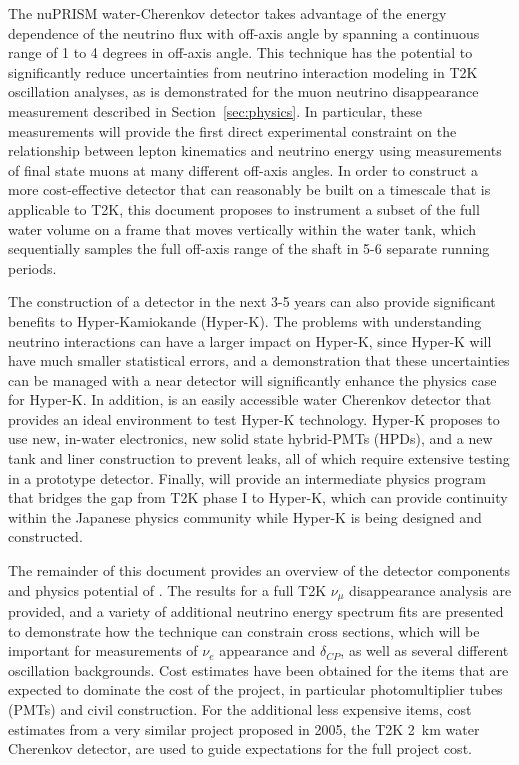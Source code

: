The nuPRISM water-Cherenkov detector takes advantage of the energy dependence of the neutrino flux with off-axis angle by spanning a continuous range of 1 to 4 degrees in off-axis angle.
This technique has the potential to significantly reduce uncertainties from neutrino interaction modeling in T2K oscillation analyses, as is demonstrated for the muon neutrino disappearance measurement described in Section~\ref{sec:physics}. In particular, these measurements will provide the first direct experimental constraint on the relationship between lepton kinematics and neutrino energy using measurements of final state muons at many different off-axis angles.
 In order to construct a more cost-effective detector that can reasonably be built on a timescale that is applicable to T2K, this document proposes to instrument a subset of the full water volume on a frame that moves vertically within the water tank, which sequentially samples the full off-axis range of the shaft in 5-6 separate running periods.

The construction of a \nuprism detector in the next 3-5 years can also provide significant benefits to Hyper-Kamiokande (Hyper-K). The problems with understanding neutrino interactions can have a larger impact on Hyper-K, since Hyper-K will have much smaller statistical errors, and a demonstration that these uncertainties can be managed with a \nuprism near detector will significantly enhance the physics case for Hyper-K.
In addition, \nuprism is an easily accessible water Cherenkov detector that provides an ideal environment to test Hyper-K technology. Hyper-K proposes to use new, in-water electronics, new solid state hybrid-PMTs (HPDs), and a new tank and liner construction to prevent leaks, all of which require extensive testing in a prototype detector.
Finally, \nuprism will provide an intermediate physics program that bridges the gap from T2K phase I to Hyper-K, which can provide continuity within the Japanese physics community while Hyper-K is being designed and constructed.

The remainder of this document provides an overview of the detector components and physics potential of \nuprism. The results for a full T2K $\nu_\mu$ disappearance analysis are provided, and a variety of additional \nuprism neutrino energy spectrum fits are presented to demonstrate how the \nuprism technique can constrain \nue cross sections, which will be important for measurements of $\nu_e$ appearance and $\delta_{CP}$, as well as several different oscillation backgrounds. Cost estimates have been obtained for the items that are expected to dominate the cost of the project, in particular photomultiplier tubes (PMTs) and civil construction. For the additional less expensive items, cost estimates from a very similar project proposed in 2005, the T2K 2~km water Cherenkov detector, are used to guide expectations for the full \nuprism project cost.

